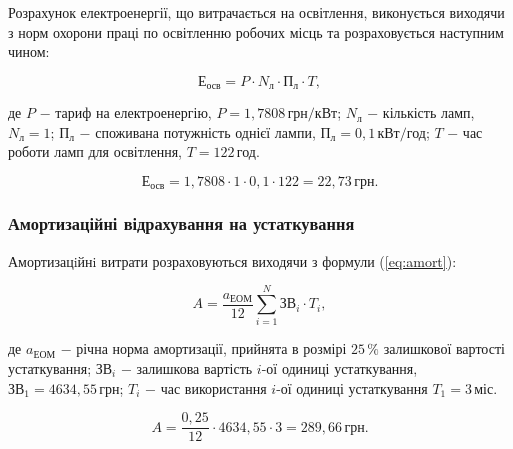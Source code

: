Розрахунок електроенергії, що витрачається на освітлення, виконується виходячи з норм охорони праці по освітленню робочих місць та розраховується наступним чином:

\begin{equation}\label{eq:osv}
\text{Е}_{\text{осв}} = P \cdot N_{\text{л}} \cdot \text{П}_{\text{л}} \cdot T,
\end{equation}

\noindent де $P$ $-$ тариф на електроенергію, $P = 1,7808 \, \text{грн}/\text{кВт}$; \newline
\hspace*{15pt}$N_{\text{л}}$ $-$ кількість ламп, $N_{\text{л}} = 1$;\newline
\hspace*{15pt}$\text{П}_{\text{л}}$ $-$ споживана потужність однієї лампи, $\text{П}_{\text{л}} = 0,1 \, \text{кВт}/\text{год}$;\newline
\hspace*{15pt}$T$ $-$ час роботи ламп для освітлення, $T = 122 \, \text{год}$.

\[
\text{Е}_{\text{осв}} = 1,7808 \cdot 1 \cdot 0,1 \cdot 122 = 22,73 \, \text{грн}.
\]

\vspace{1.5em}

\subsubsection{Амортизаційні відрахування на устаткування}

Амортизацiйнi витрати розраховуються виходячи з формули (\ref{eq:amort}):

\begin{equation}\label{eq:amort}
A = \frac{a_{\text{ЕОМ}}}{12}\sum_{i=1}^{N}\text{ЗВ}_{i} \cdot T_{i},
\end{equation}

\noindent де $a_{\text{ЕОМ}}$ $-$ річна норма амортизації, прийнята в розмірі $ 25 \, \%$ залишкової вартості устаткування;\newline
\hspace*{23pt}$\text{ЗВ}_{i}$ $-$ залишкова вартість $i$-ої одиниці устаткування, $\text{ЗВ}_{1} = 4634,55 \, \text{грн}$;\newline
\hspace*{23pt}$T_{i}$ $-$ час використання $i$-ої одиниці устаткування $T_{1} = 3 \, \text{міс}$.

\[
A = \frac{0,25}{12} \cdot 4634,55 \cdot 3 = 289,66 \, \text{грн}.
\]

